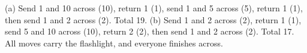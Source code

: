 (a) Send 1 and 10 across (10), return 1 (1), send 1 and 5 across (5), return 1 (1), then send 1 and 2 across (2). Total 19. (b) Send 1 and 2 across (2), return 1 (1), send 5 and 10 across (10), return 2 (2), then send 1 and 2 across (2). Total 17. All moves carry the flashlight, and everyone finishes across.
